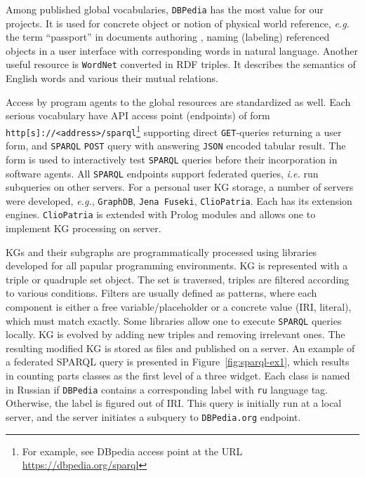 \documentclass[
]{ceurart}
\begin{document}
Among published global vocabularies, \texttt{DBPedia} has the most value for our projects. It is used for concrete object or notion of physical world reference, \emph{e.g.} the term ``passport'' in documents authoring \cite{}, naming (labeling) referenced objects in a user interface with corresponding words in natural language. Another useful resource is \texttt{WordNet} converted in RDF triples.  It describes the semantics of English words and various their mutual relations.

Access by program agents to the global resources are standardized as well.  Each serious vocabulary have API access point (endpoints) of form
\verb|http[s]://<address>/sparql|\footnote{For example, see DBpedia access point at the URL \url{https://dbpedia.org/sparql}} supporting direct \texttt{GET}-queries returning a user form, and \texttt{SPARQL} \texttt{POST} query with answering \texttt{JSON} encoded tabular result.  The form is used to interactively test \texttt{SPARQL} queries before their incorporation in software agents.  All \texttt{SPARQL} endpoints support federated queries, \emph{i.e.} run subqueries on other servers.   For a personal user KG storage, a number of servers were developed, \emph{e.g.}, \texttt{GraphDB}, \texttt{Jena Fuseki}, \texttt{ClioPatria}.  Each has its extension engines.  \texttt{ClioPatria} is extended with Prolog modules and allows one to implement KG processing on server.

KGs and their subgraphs are programmatically processed using libraries developed for all papular programming environments. KG is represented with a triple or quadruple set object. The set is traversed, triples are filtered according to various conditions. Filters are usually defined as patterns, where each component is either a free variable/placeholder or a concrete value (IRI, literal), which must match exactly.   Some libraries allow one to execute \texttt{SPARQL} queries locally. KG is evolved by adding new triples and removing irrelevant ones. The resulting modified KG is stored as files and published on a server. An example of a federated SPARQL query is presented in Figure~\ref{fig:sparql-ex1}, which results in counting parts classes as the first level of a three widget. Each class is named in Russian if \texttt{DBPedia} contains a corresponding label with \texttt{ru} language tag.  Otherwise, the label is figured out of IRI. This query is initially run at a local server, and the server initiates a subquery to \texttt{DBPedia.org} endpoint.
\end{document}
